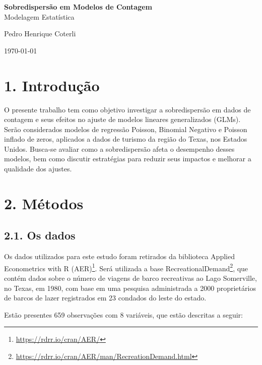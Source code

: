 \documentclass[
]{article}
\author{}
\date{\vspace{-2.5em}}
\begin{document}
\begin{center}
{\LARGE \textbf{Sobredispersão em Modelos de Contagem}\\
Modelagem Estatística \par}
\vspace{0.5cm}

{\large Pedro Henrique Coterli \par}

{\large \today \par}
\end{center}

\section{1. Introdução}\label{introduuxe7uxe3o}

O presente trabalho tem como objetivo investigar a sobredispersão em
dados de contagem e seus efeitos no ajuste de modelos lineares
generalizados (GLMs). Serão considerados modelos de regressão Poisson,
Binomial Negativo e Poisson inflado de zeros, aplicados a dados de
turismo da região do Texas, nos Estados Unidos. Busca-se avaliar como a
sobredispersão afeta o desempenho desses modelos, bem como discutir
estratégias para reduzir seus impactos e melhorar a qualidade dos
ajustes.

\section{2. Métodos}\label{muxe9todos}

\subsection{2.1. Os dados}\label{os-dados}

Os dados utilizados para este estudo foram retirados da biblioteca
Applied Econometrics with R (AER)\footnote{\url{https://rdrr.io/cran/AER/}}.
Será utilizada a base RecreationalDemand\footnote{\url{https://rdrr.io/cran/AER/man/RecreationDemand.html}},
que contém dados sobre o número de viagens de barco recreativas ao Lago
Somerville, no Texas, em 1980, com base em uma pesquisa administrada a
2000 proprietários de barcos de lazer registrados em 23 condados do
leste do estado.

Estão presentes 659 observações com 8 variáveis, que estão descritas a
seguir:
\end{document}
